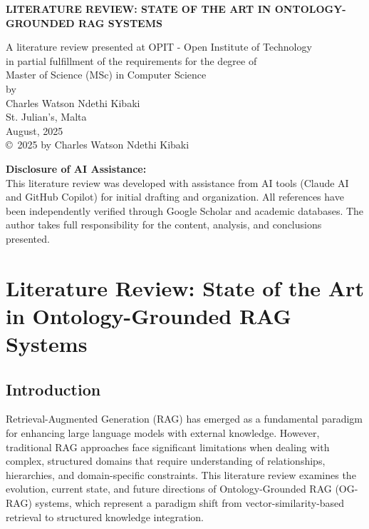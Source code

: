 \documentclass[12pt]{report}
\begin{document}
\begin{titlepage}
\centering
{\Large\bfseries LITERATURE REVIEW: STATE OF THE ART IN ONTOLOGY-GROUNDED RAG SYSTEMS \par}
\vfill
A literature review presented at OPIT - Open Institute of Technology\\
in partial fulfillment of the requirements for the degree of\\
Master of Science (MSc) in Computer Science\\
\vfill
by\\
Charles Watson Ndethi Kibaki\\
\vfill
St. Julian's, Malta\\
August, 2025\\
\vfill
\copyright~2025 by Charles Watson Ndethi Kibaki

\vspace{2cm}
{\color{aidisclosure}\textbf{Disclosure of AI Assistance:}\\
This literature review was developed with assistance from AI tools (Claude AI and GitHub Copilot) for initial drafting and organization. All references have been independently verified through Google Scholar and academic databases. The author takes full responsibility for the content, analysis, and conclusions presented.}
\end{titlepage}

\tableofcontents
\newpage

\setcounter{page}{1}

\chapter{Literature Review: State of the Art in Ontology-Grounded RAG Systems}

\section{Introduction}

Retrieval-Augmented Generation (RAG) has emerged as a fundamental paradigm for enhancing large language models with external knowledge. However, traditional RAG approaches face significant limitations when dealing with complex, structured domains that require understanding of relationships, hierarchies, and domain-specific constraints. This literature review examines the evolution, current state, and future directions of Ontology-Grounded RAG (OG-RAG) systems, which represent a paradigm shift from vector-similarity-based retrieval to structured knowledge integration.
\end{document}

